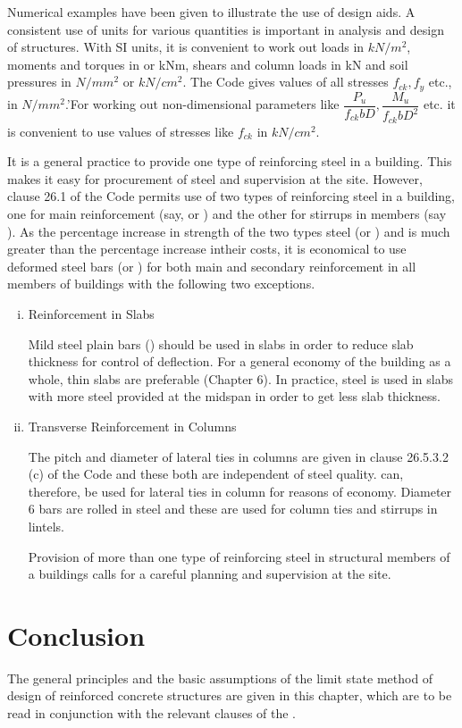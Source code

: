 Numerical examples have been given to illustrate the use of design aids.
A consistent use of units for various quantities is important in analysis
and design of structures. With SI units, it is convenient to work out
loads in $kN/m^2$, moments and torques in or kNm, shears and column
loads in kN and soil pressures in $N/mm^2$ or $kN/cm^2$. The Code
gives values of all stresses $f_{ck}, f_y$ etc., in $N/mm^2$.'For working
out non-dimensional parameters like
$\dfrac{P_u}{f_{ck}bD},\dfrac{M_u}{f_{ck}bD^2}$ etc. it is convenient to
use  values of stresses like $f_{ck}$ in $kN/cm^2$.


It is a general practice to provide one type of reinforcing steel in a
building. This makes it easy for procurement of steel and supervision 
at the site. However, clause 26.1 of the Code permits use of two types
of reinforcing steel in a building, one for main reinforcement (say,
{\fefouronefive} or {\fefivezerozero}) and the other for stirrups in members
(say {\fetwofivezero}).
As the percentage increase in strength of the two types steel
\fefouronefive
(or {\fefivezerozero}) and {\fetwofivezero} is much greater than the
percentage increase intheir costs, it is economical to use deformed steel
bars {\fefouronefive} (or \fefivezerozero) for both main and secondary
reinforcement in all members of buildings with the following two exceptions.

\begin{enumerate}[(i)]
\item Reinforcement in Slabs

Mild steel plain bars (\fetwofivezero) should be used in slabs in order to reduce
slab thickness for control of deflection. For a general economy of the
building as a whole, thin slabs are preferable (Chapter 6). In practice,
{\fefouronefive} steel is used in slabs with more steel provided at the midspan
in order to get less slab thickness.

\item Transverse Reinforcement in Columns

The pitch and diameter of lateral ties in columns are given in clause
26.5.3.2 (c) of the Code and these both are independent of steel quality.
{\fetwofivezero} can, therefore, be used for lateral ties in column for
reasons of economy. Diameter 6 \mm bars are rolled in {\fetwofivezero}
steel and these are used for column ties and stirrups in lintels.

Provision of more than one type of reinforcing steel in structural
members of a buildings calls for a careful planning and supervision at
the site.
\end{enumerate}

\section{Conclusion}
The general principles and the basic assumptions of the limit state
method of design of reinforced concrete structures are given in this
chapter, which are to be read in conjunction with the relevant clauses
of the .
